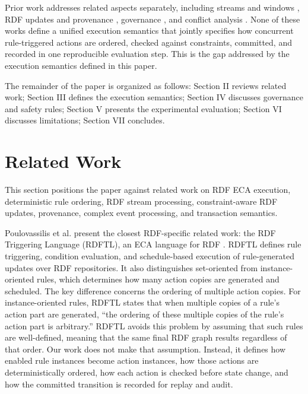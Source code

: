 \documentclass{ieeeaccess}
\theoremstyle{definition}
\theoremstyle{plain}
\theoremstyle{remark}
\begin{document}
Prior work addresses related aspects separately, including streams and windows \cite{DellAglio2014RSPQL}, RDF updates and provenance \cite{Halpin2014SPARQLProvenance}, governance \cite{Kirrane2017RDFAccessControlSurvey,Costabello2012ContextAwareAccess},
and conflict analysis \cite{Chen2024TapChecker,Xing2024CCDFTAP}. None of these works define a unified execution semantics that jointly specifies how concurrent rule-triggered actions are
ordered, checked against constraints, committed, and recorded in one reproducible evaluation step. This is the gap addressed by the execution semantics defined in this paper.

The remainder of the paper is organized as follows: Section II reviews related work; Section III defines the execution semantics; Section IV discusses governance and safety rules; Section V presents the experimental evaluation; Section VI discusses limitations; Section VII concludes.

\section{Related Work}
This section positions the paper against related work on RDF ECA execution, deterministic rule ordering, RDF stream processing, constraint-aware RDF updates, provenance, complex event processing, and transaction semantics.

Poulovassilis et al. present the closest RDF-specific related work: the RDF Triggering Language (RDFTL), an ECA language for RDF \cite{papamarkos}. RDFTL defines rule triggering, condition evaluation, and schedule-based execution of rule-generated updates over RDF repositories. It also distinguishes set-oriented from instance-oriented rules, which determines how many action copies are generated and scheduled. The key difference concerns the ordering of multiple action copies. For instance-oriented rules, RDFTL states that when multiple copies of a rule's action part are generated, ``the ordering of these multiple copies of the rule's action part is arbitrary.'' RDFTL avoids this problem by assuming that such rules are well-defined, meaning that the same final RDF graph results regardless of that order. Our work does not make that assumption. Instead, it defines how enabled rule instances become action instances, how those actions are deterministically ordered, how each action is checked before state change, and how the committed transition is recorded for replay and audit.
\end{document}
